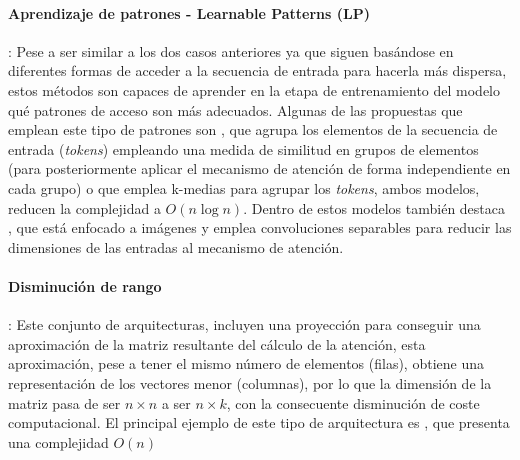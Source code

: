 \paragraph{Aprendizaje de patrones - Learnable Patterns (LP)}:
Pese a ser similar a los dos casos anteriores ya que siguen basándose en diferentes formas de acceder a la secuencia de entrada para hacerla más dispersa, estos métodos son capaces de aprender en la etapa de entrenamiento del modelo qué patrones de acceso son más adecuados. Algunas de las propuestas que emplean este tipo de patrones son  \cite{Kitaev2020Reformer:}, que agrupa los elementos de la secuencia de entrada (\textit{tokens}) empleando una medida de similitud en grupos de elementos (para posteriormente aplicar el mecanismo de atención de forma independiente en cada grupo) o  \cite{routingtransformer} que emplea k-medias para agrupar los \textit{tokens}, ambos modelos, reducen la complejidad a $O(n \log n)$. Dentro de estos modelos también destaca  \cite{zhql2021ResT}, que está enfocado a imágenes y emplea convoluciones separables para reducir las dimensiones de las entradas al mecanismo de atención.


\paragraph{Disminución de rango}:
Este conjunto de arquitecturas, incluyen una proyección para conseguir una aproximación de la matriz resultante del cálculo de la atención, esta aproximación, pese a tener el mismo número de elementos (filas), obtiene una representación de los vectores menor (columnas), por lo que la dimensión de la matriz pasa de ser $n \times n$ a ser $n \times k$, con la consecuente disminución de coste computacional. El principal ejemplo de este tipo de arquitectura es , \cite{wang2020linformer} que presenta una complejidad $O(n)$

